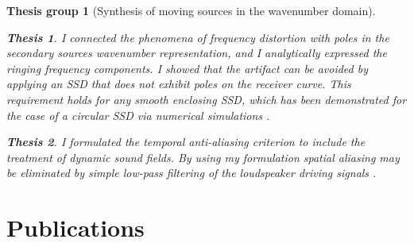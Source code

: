 \documentclass[10pt,twoside]{article}
\theoremstyle{thesisgroupstyle}
\newtheorem{thesisgroup}{Thesis group}
\theoremstyle{indented}
\newtheorem{thesis}{Thesis}[thesisgroup]
\begin{document}
\begin{thesisgroup}[Synthesis of moving sources in the wavenumber domain]
\begin{thesis}
I connected the phenomena of frequency distortion with poles in the secondary sources wavenumber representation, and I analytically expressed the ringing frequency components.
I showed that the artifact can be avoided by applying an SSD that does not exhibit poles on the receiver curve.
This requirement holds for any smooth enclosing SSD, which has been demonstrated for the case of a circular SSD via numerical simulations \cite{firtha2016:daga_booklet}.
\end{thesis}
\begin{thesis} 
I formulated the temporal anti-aliasing criterion to include the treatment of dynamic sound fields.
By using my formulation spatial aliasing may be eliminated by simple low-pass filtering of the loudspeaker driving signals \cite{Firtha2018_daga_moving_source_booklet}.
\end{thesis}
\end{thesisgroup}

\clearpage
\section*{Publications}

\nocite{*}
\begin{refcontext}[labelprefix=J]
\printbibliography[title={Journal papers}, keyword=J, heading=subbibliography] 
\end{refcontext}
\begin{refcontext}[labelprefix=C]
\printbibliography[title={Conference papers}, keyword=C, heading=subbibliography] 
\end{refcontext}
\begin{refcontext}[labelprefix=O]
\printbibliography[title={Other publications}, keyword=O, heading=subbibliography] 
\end{refcontext}
\end{document}
